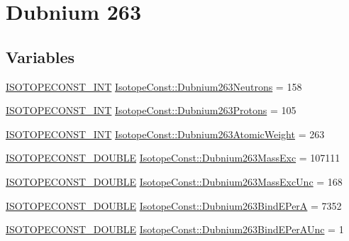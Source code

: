 \hypertarget{group___isotope_const-_dubnium-_db263}{}\section{Dubnium 263}
\label{group___isotope_const-_dubnium-_db263}
\subsection*{Variables}
\begin{DoxyCompactItemize}
\item 
\mbox{\hyperlink{group___isotope_const-_macros_ga5f18360b3e99483a35c32d789e62621c}{I\+S\+O\+T\+O\+P\+E\+C\+O\+N\+S\+T\+\_\+\+I\+NT}} \mbox{\hyperlink{group___isotope_const-_dubnium-_db263_gaa0943b2b0eabb1a188c7a60f1567c52c}{Isotope\+Const\+::\+Dubnium263\+Neutrons}} = 158
\item 
\mbox{\hyperlink{group___isotope_const-_macros_ga5f18360b3e99483a35c32d789e62621c}{I\+S\+O\+T\+O\+P\+E\+C\+O\+N\+S\+T\+\_\+\+I\+NT}} \mbox{\hyperlink{group___isotope_const-_dubnium-_db263_ga49a8bd62bc4b549ca104b6c02e6422d3}{Isotope\+Const\+::\+Dubnium263\+Protons}} = 105
\item 
\mbox{\hyperlink{group___isotope_const-_macros_ga5f18360b3e99483a35c32d789e62621c}{I\+S\+O\+T\+O\+P\+E\+C\+O\+N\+S\+T\+\_\+\+I\+NT}} \mbox{\hyperlink{group___isotope_const-_dubnium-_db263_ga75419fcc2b14a2e9ebec110849b06ff1}{Isotope\+Const\+::\+Dubnium263\+Atomic\+Weight}} = 263
\item 
\mbox{\hyperlink{group___isotope_const-_macros_ga8f45a7272ce02c0b4c65c44636ed719a}{I\+S\+O\+T\+O\+P\+E\+C\+O\+N\+S\+T\+\_\+\+D\+O\+U\+B\+LE}} \mbox{\hyperlink{group___isotope_const-_dubnium-_db263_gae6c954405900e9abec8f7710cf95724c}{Isotope\+Const\+::\+Dubnium263\+Mass\+Exc}} = 107111
\item 
\mbox{\hyperlink{group___isotope_const-_macros_ga8f45a7272ce02c0b4c65c44636ed719a}{I\+S\+O\+T\+O\+P\+E\+C\+O\+N\+S\+T\+\_\+\+D\+O\+U\+B\+LE}} \mbox{\hyperlink{group___isotope_const-_dubnium-_db263_gac926d7c9d613b652348cdcacf5da39e1}{Isotope\+Const\+::\+Dubnium263\+Mass\+Exc\+Unc}} = 168
\item 
\mbox{\hyperlink{group___isotope_const-_macros_ga8f45a7272ce02c0b4c65c44636ed719a}{I\+S\+O\+T\+O\+P\+E\+C\+O\+N\+S\+T\+\_\+\+D\+O\+U\+B\+LE}} \mbox{\hyperlink{group___isotope_const-_dubnium-_db263_ga9b0cd1e4f8f995876cf5292b58af29a2}{Isotope\+Const\+::\+Dubnium263\+Bind\+E\+PerA}} = 7352
\item 
\mbox{\hyperlink{group___isotope_const-_macros_ga8f45a7272ce02c0b4c65c44636ed719a}{I\+S\+O\+T\+O\+P\+E\+C\+O\+N\+S\+T\+\_\+\+D\+O\+U\+B\+LE}} \mbox{\hyperlink{group___isotope_const-_dubnium-_db263_ga9e189ec228499e0f908d89642368b538}{Isotope\+Const\+::\+Dubnium263\+Bind\+E\+Per\+A\+Unc}} = 1

\end{DoxyCompactItemize}
